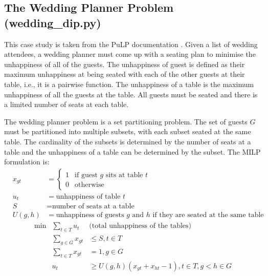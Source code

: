 \subsection{The Wedding Planner Problem (wedding\_dip.py)} \label{sbs:wedding}

This case study is taken from the PuLP documentation \cite{pulp}. Given a list of wedding attendees, a wedding planner must come up with a seating plan to minimise the unhappiness of all of the guests. The unhappiness of guest is defined as their maximum unhappiness at being seated with each of the other guests at their table, i.e., it is a pairwise function. The unhappiness of a table is the maximum unhappiness of all the guests at the table. All guests must be seated and there is a limited number of seats at each table.

The wedding planner problem is a set partitioning problem. The set of guests $G$ must be partitioned into multiple subsets, with each subset seated at the same table. The cardinality of the subsets is determined by the number of seats at a table and the unhappiness of a table can be determined by the subset. The \ac{MILP} formulation is:
\[
\begin{array}{rrl}
& x_{gt} &= \begin{cases} 1 & \text{if guest $g$ sits at table $t$} \\
 0 & \text{otherwise} \end{cases} \\
& u_t &= \text{unhappiness of table $t$} \\
& S &= \text{number of seats at a table} \\
& U(g, h) &= \text{unhappiness of guests $g$ and $h$ if they are seated at the same table}
\end{array}
\]\[
\begin{array}{rrl}
\min & \displaystyle \sum_{t \in T} u_t & \text{(total unhappiness of the tables)} \\
& \displaystyle \sum_{g \in G} x_{gt} &\leq S, t \in T \\
& \displaystyle \sum_{t \in T} x_{gt} &=1, g \in G \\
& u_t &\geq U(g, h) (x_{gt} + x_{ht} - 1), t \in T, g < h \in G
\end{array}
\]

